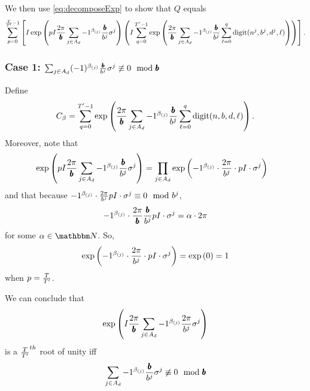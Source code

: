 
We then use \eqref{eq:decomposeExp} to show that $Q$ equals
\begin{equation}
\label{eq:inner-outer-split}
  \sum_{p= 0}^{\frac{T}{{T}'} - 1} \left[
    I \exp\left(
      pI \frac{2\pi}{{\pmb{b}}} \sum_{j \in A_d} -1 ^ {\beta_{(j)}}
      \frac{{\pmb{b}}}{b^j}
      \sigma^j
    \right)
  \left(
  I \sum_{q = 0}^{{T}' - 1}
    \exp\left(
        \frac{2\pi}{{\pmb{b}}}
        \sum_{j \in A_d} -1 ^ {\beta_{(j)}} \frac{{\pmb{b}}}{b^j}
          \sum_{\ell = 0}^{q}\mathrm{digit}(n^j, b^j, d^j, \ell)
    \right)\right)\right].
\end{equation}

\subsubsection*{Case 1: $\sum_{j \in A_d} (-1) ^ {\beta_{(j)}} \frac{{\pmb{b}}}{b^j} \sigma^j \not\equiv 0 \mod {{\pmb{b}}}$}
Define
$$
  C_\beta = \sum_{q = 0}^{{T}' - 1}
  \exp\left(
      \frac{2\pi}{{\pmb{b}}}
      \sum_{j \in A_d} -1 ^ {\beta_{(j)}} \frac{{\pmb{b}}}{b^j}
        \sum_{\ell = 0}^{q}\mathrm{digit}(n, b, d, \ell)
  \right).
$$
Moreover, note that 
\begin{align*}
  &\exp\left(
      pI \frac{2\pi}{{\pmb{b}}} \sum_{j \in A_d} -1 ^ {\beta_{(j)}}
      \frac{{\pmb{b}}}{b^j}
      \sigma^j
    \right)
  = \prod_{j \in A_d} \exp\left(
      -1^{\beta_{(j)}}
     \cdot
    	\frac{2\pi}{b^j}
     \cdot
      pI \cdot \sigma^j 
    \right)
\end{align*}
and that  because $-1^{\beta_{(j)}} \cdot \frac{2\pi}{b^j} pI \cdot \sigma^j \equiv 0 \mod b^j$,
\begin{equation*}
   -1^{\beta_{(j)}} \cdot \frac{2\pi}{{\pmb{b}}} \frac{{\pmb{b}}}{b^j} pI \cdot \sigma^j = \alpha \cdot 2\pi
\end{equation*}
for some $\alpha \in \N$. So,
\begin{equation*}
  \exp\left(-1^{\beta_{(j)}} \cdot\frac{2\pi}{b^j} \cdot pI \cdot \sigma^j \right) = \exp\left(0\right) = 1
\end{equation*}
when $p = \frac{T}{{T}'}$. 


We can conclude that
\begin{equation*}
 \exp\left(
      I \frac{2\pi}{{\pmb{b}}} \sum_{j \in A_d} -1 ^ {\beta_{(j)}}
      \frac{2\pi}{b^j}
      \sigma^j
    \right) 
\end{equation*}
is a $\frac{T}{{T}'}^{th}$ root of unity iff
$$\sum_{j \in A_d} -1 ^ {\beta_{(j)}}
      \frac{{\pmb{b}}}{b^j}
      \sigma^j \not\equiv 0 \mod {{\pmb{b}}}
$$

